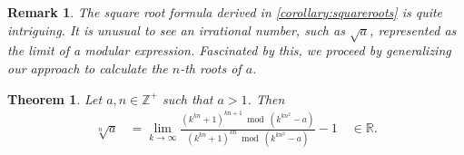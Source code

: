 \documentclass[12pt]{article}
\theoremstyle{plain}
\newtheorem{theorem}{Theorem}
\newtheorem{remark}{Remark}
\theoremstyle{definition}
\begin{document}
\begin{remark}
The square root formula derived in \cref{corollary:squareroots} is quite intriguing. It is unusual to see an irrational number, such as $\sqrt{a}$, represented as the limit of a modular expression. Fascinated by this, we proceed by generalizing our approach to calculate the $n$-th roots of $a$.   
\end{remark}

\begin{theorem} \label{proof:roots}
Let $a,n \in \mathbb{Z}^+$ such that $a > 1$. Then
\begin{align*}
\sqrt[n]{a} &= \lim_{k\rightarrow\infty}
    \frac{(k^{kn} + 1)^{kn+1} \bmod{(k^{kn^2}-a)}}
    {(k^{kn} + 1)^{kn} \bmod{ (k^{kn^2}-a)}} - 1  \quad \in \mathbb{R} .
\end{align*}
\end{theorem}
\end{document}
